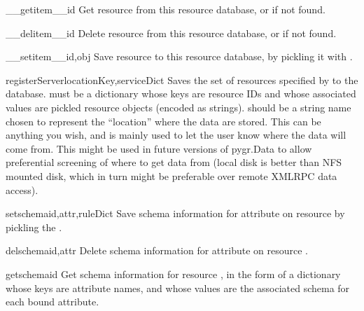 \documentclass{howto}
\begin{document}
\begin{funcdesc}{__getitem__}{id}
  Get resource  from this resource database, or  
  if not found.
\end{funcdesc}

\begin{funcdesc}{__delitem__}{id}
  Delete resource  from this resource database, or  
  if not found.
\end{funcdesc}

\begin{funcdesc}{__setitem__}{id,obj}
  Save resource  to this resource database, by pickling it
  with .
\end{funcdesc}

\begin{funcdesc}{registerServer}{locationKey,serviceDict}
  Saves the set of resources specified by  to the
  database.
   must be a dictionary whose keys are resource IDs and
  whose associated values are pickled resource objects (encoded as strings).
   should be a string name chosen to represent the ``location''
  where the data are stored.  This can be anything you wish, and is mainly used
  to let the user know where the data will come from.  This might be used
  in future versions of pygr.Data to allow preferential screening of where
  to get data from (local disk is better than NFS mounted disk, which in turn
  might be preferable over remote XMLRPC data access).
\end{funcdesc}

\begin{funcdesc}{setschema}{id,attr,ruleDict}
  Save schema information for attribute  on resource 
  by pickling the .
\end{funcdesc}

\begin{funcdesc}{delschema}{id,attr}
  Delete schema information for attribute  on resource .
\end{funcdesc}

\begin{funcdesc}{getschema}{id}
  Get schema information for resource , in the form of a dictionary
  whose keys are attribute names, and whose values are the associated
  schema  for each bound attribute.
\end{funcdesc}
\end{document}
